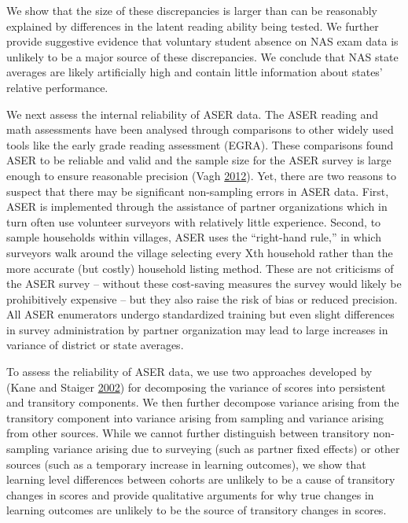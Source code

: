 \documentclass[
  11pt,
]{article}
\begin{document}
We show that the size of these discrepancies is larger than can be reasonably explained by differences in the latent reading ability being tested. We further provide suggestive evidence that voluntary student absence on NAS exam data is unlikely to be a major source of these discrepancies. We conclude that NAS state averages are likely artificially high and contain little information about states' relative performance.

We next assess the internal reliability of ASER data. The ASER reading and math assessments have been analysed through comparisons to other widely used tools like the early grade reading assessment (EGRA). These comparisons found ASER to be reliable and valid and the sample size for the ASER survey is large enough to ensure reasonable precision (Vagh \protect\hyperlink{ref-vagh2012validating}{2012}). Yet, there are two reasons to suspect that there may be significant non-sampling errors in ASER data. First, ASER is implemented through the assistance of partner organizations which in turn often use volunteer surveyors with relatively little experience. Second, to sample households within villages, ASER uses the ``right-hand rule,'' in which surveyors walk around the village selecting every Xth household rather than the more accurate (but costly) household listing method. These are not criticisms of the ASER survey -- without these cost-saving measures the survey would likely be prohibitively expensive -- but they also raise the risk of bias or reduced precision. All ASER enumerators undergo standardized training but even slight differences in survey administration by partner organization may lead to large increases in variance of district or state averages.

To assess the reliability of ASER data, we use two approaches developed by (Kane and Staiger \protect\hyperlink{ref-kane2002promise}{2002}) for decomposing the variance of scores into persistent and transitory components. We then further decompose variance arising from the transitory component into variance arising from sampling and variance arising from other sources. While we cannot further distinguish between transitory non-sampling variance arising due to surveying (such as partner fixed effects) or other sources (such as a temporary increase in learning outcomes), we show that learning level differences between cohorts are unlikely to be a cause of transitory changes in scores and provide qualitative arguments for why true changes in learning outcomes are unlikely to be the source of transitory changes in scores.
\end{document}
